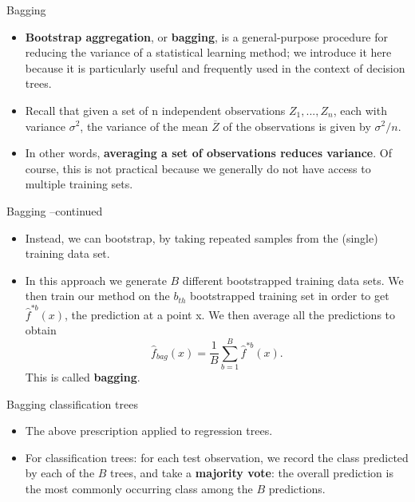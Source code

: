 \documentclass[aspectratio=169, 11pt]{beamer}
\begin{document}
\begin{frame}{Bagging}
    \begin{itemize}
        \item \textbf{Bootstrap aggregation}, or \textbf{bagging}, is a general-purpose procedure for reducing the variance of a statistical learning method; we introduce it here because it is particularly useful and frequently used in the context of decision trees.
        \item Recall that given a set of n independent observations $Z_{1},...,Z_{n}$, each with variance $\sigma^{2}$, the variance of the mean $\overline{Z}$ of the observations is given by $\sigma^{2}/n$.
        \item In other words, \textbf{averaging a set of observations reduces variance}. Of course, this is not practical because we generally do not have access to multiple training sets.
    \end{itemize}
\end{frame}

\begin{frame}{Bagging --continued}
    \begin{itemize}
        \item Instead, we can bootstrap, by taking repeated samples from the (single) training data set.
        \item In this approach we generate $B$ different bootstrapped training data sets. We then train our method on the $b_{th}$ bootstrapped training set in order to get $\hat{f}^{*b}(x)$, the prediction at a point x. We then average all the predictions to obtain
        \begin{equation*}
        \hat{f}_{bag}(x)=\frac{1}{B}\sum_{b=1}^{B}\hat{f}^{*b}(x).
        \end{equation*}
        This is called \textbf{bagging}.
    \end{itemize}
\end{frame}

\begin{frame}{Bagging classification trees}
    \begin{itemize}
        \item The above prescription applied to regression trees.
        \item For classification trees: for each test observation, we record the class predicted by each of the $B$ trees, and take a \textbf{majority vote}: the overall prediction is the most commonly occurring class among the $B$ predictions.
    \end{itemize}
\end{frame}
\end{document}
